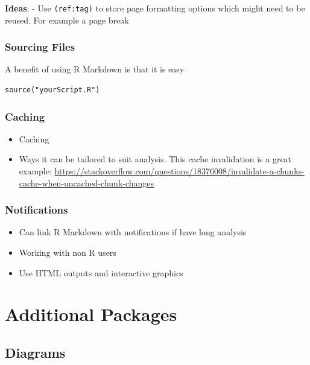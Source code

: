 \documentclass[]{book}
\providecommand{\tightlist}{%
  \setlength{\itemsep}{0pt}\setlength{\parskip}{0pt}}
\begin{document}
\textbf{Ideas}: - Use \texttt{(ref:tag)} to store page formatting
options which might need to be reused. For example a page break

\section{Sourcing Files}\label{sourcing-files}

A benefit of using R Markdown is that it is easy

\begin{verbatim}
source("yourScript.R")
\end{verbatim}

\section{Caching}\label{caching}

\begin{itemize}
\tightlist
\item
  Caching
\item
  Ways it can be tailored to suit analysis. This cache invalidation is a
  great example:
  \url{https://stackoverflow.com/questions/18376008/invalidate-a-chunks-cache-when-uncached-chunk-changes}
\end{itemize}

\section{Notifications}\label{notifications}

\begin{itemize}
\tightlist
\item
  Can link R Markdown with notifications if have long analysis
\end{itemize}

\begin{itemize}
\tightlist
\item
  Working with non R users
\item
  Use HTML outputs and interactive graphics
\end{itemize}

\part{Additional Packages}\label{part-additional-packages}

\chapter{Diagrams}\label{diagrams}
\end{document}
